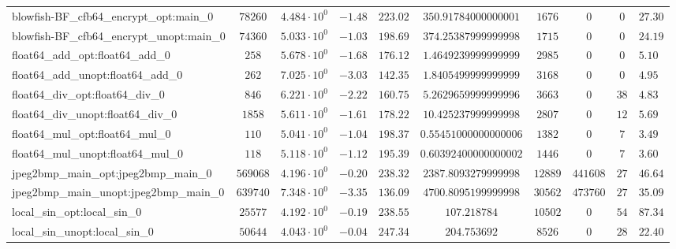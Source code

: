 \begin{tabular}{|l|c|HHc|c|c|c|cH|}
blowfish-BF\_cfb64\_encrypt\_opt:main\_0        & $ 78260    $ & $ 4.484 \cdot 10^{0} $ & $ -1.48 $ & $ 223.02 $ & $ 350.91784000000001   $ & $ 1676   $ & $ 0       $ & $ 0   $ & $ 27.30   $ \\
blowfish-BF\_cfb64\_encrypt\_unopt:main\_0      & $ 74360    $ & $ 5.033 \cdot 10^{0} $ & $ -1.03 $ & $ 198.69 $ & $ 374.25387999999998   $ & $ 1715   $ & $ 0       $ & $ 0   $ & $ 24.19   $ \\
float64\_add\_opt:float64\_add\_0               & $ 258      $ & $ 5.678 \cdot 10^{0} $ & $ -1.68 $ & $ 176.12 $ & $ 1.4649239999999999   $ & $ 2985   $ & $ 0       $ & $ 0   $ & $ 5.10    $ \\
float64\_add\_unopt:float64\_add\_0             & $ 262      $ & $ 7.025 \cdot 10^{0} $ & $ -3.03 $ & $ 142.35 $ & $ 1.8405499999999999   $ & $ 3168   $ & $ 0       $ & $ 0   $ & $ 4.95    $ \\
float64\_div\_opt:float64\_div\_0               & $ 846      $ & $ 6.221 \cdot 10^{0} $ & $ -2.22 $ & $ 160.75 $ & $ 5.2629659999999996   $ & $ 3663   $ & $ 0       $ & $ 38  $ & $ 4.83    $ \\
float64\_div\_unopt:float64\_div\_0             & $ 1858     $ & $ 5.611 \cdot 10^{0} $ & $ -1.61 $ & $ 178.22 $ & $ 10.425237999999998   $ & $ 2807   $ & $ 0       $ & $ 12  $ & $ 5.69    $ \\
float64\_mul\_opt:float64\_mul\_0               & $ 110      $ & $ 5.041 \cdot 10^{0} $ & $ -1.04 $ & $ 198.37 $ & $ 0.55451000000000006  $ & $ 1382   $ & $ 0       $ & $ 7   $ & $ 3.49    $ \\
float64\_mul\_unopt:float64\_mul\_0             & $ 118      $ & $ 5.118 \cdot 10^{0} $ & $ -1.12 $ & $ 195.39 $ & $ 0.60392400000000002  $ & $ 1446   $ & $ 0       $ & $ 7   $ & $ 3.60    $ \\
jpeg2bmp\_main\_opt:jpeg2bmp\_main\_0           & $ 569068   $ & $ 4.196 \cdot 10^{0} $ & $ -0.20 $ & $ 238.32 $ & $ 2387.8093279999998   $ & $ 12889  $ & $ 441608  $ & $ 27  $ & $ 46.64   $ \\
jpeg2bmp\_main\_unopt:jpeg2bmp\_main\_0         & $ 639740   $ & $ 7.348 \cdot 10^{0} $ & $ -3.35 $ & $ 136.09 $ & $ 4700.8095199999998   $ & $ 30562  $ & $ 473760  $ & $ 27  $ & $ 35.09   $ \\
local\_sin\_opt:local\_sin\_0                   & $ 25577    $ & $ 4.192 \cdot 10^{0} $ & $ -0.19 $ & $ 238.55 $ & $ 107.218784           $ & $ 10502  $ & $ 0       $ & $ 54  $ & $ 87.34   $ \\
local\_sin\_unopt:local\_sin\_0                 & $ 50644    $ & $ 4.043 \cdot 10^{0} $ & $ -0.04 $ & $ 247.34 $ & $ 204.753692           $ & $ 8526   $ & $ 0       $ & $ 28  $ & $ 22.40   $ \\

\end{tabular}

